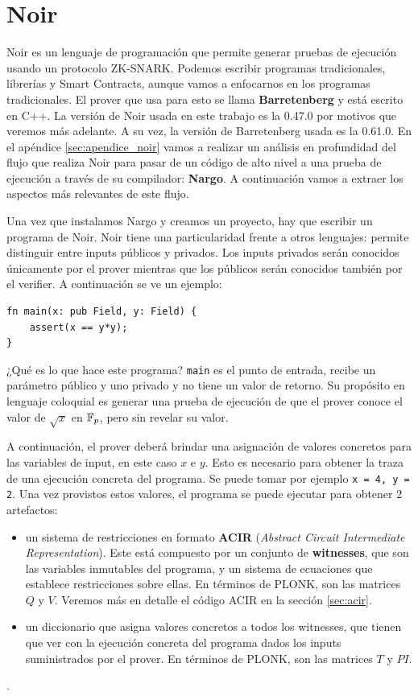 \chapter{Noir}\label{sec:noir}
Noir es un lenguaje de programación que permite generar pruebas de ejecución usando un protocolo ZK-SNARK. Podemos escribir programas tradicionales, librerías y Smart Contracts, aunque vamos a enfocarnos en los programas tradicionales. El prover que usa para esto se llama \textbf{Barretenberg} y está escrito en C++. La versión de Noir usada en este trabajo es la 0.47.0 por motivos que veremos más adelante. A su vez, la versión de Barretenberg usada es la 0.61.0. En el apéndice \ref{sec:apendice_noir} vamos a realizar un análisis en profundidad del flujo que realiza Noir para pasar de un código de alto nivel a una prueba de ejecución a través de su compilador: \textbf{Nargo}. A continuación vamos a extraer los aspectos más relevantes de este flujo.

Una vez que instalamos Nargo y creamos un proyecto, hay que escribir un programa de Noir. Noir tiene una particularidad frente a otros lenguajes: permite distinguir entre inputs públicos y privados. Los inputs privados serán conocidos únicamente por el prover mientras que los públicos serán conocidos también por el verifier. A continuación se ve un ejemplo:

\begin{verbatim}
fn main(x: pub Field, y: Field) {
    assert(x == y*y);
}
\end{verbatim}


¿Qué es lo que hace este programa? \texttt{main} es el punto de entrada, recibe un parámetro público y uno privado y no tiene un valor de retorno. Su propósito en lenguaje coloquial es generar una prueba de ejecución de que el prover conoce el valor de $\sqrt{x}$ en $\mathbb{F}_p$, pero sin revelar su valor. 

A continuación, el prover deberá brindar una asignación de valores concretos para las variables de input, en este caso $x$ e $y$. Esto es necesario para obtener la traza de una ejecución concreta del programa. Se puede tomar por ejemplo \texttt{x = 4, y = 2}. Una vez provistos estos valores, el programa se puede ejecutar para obtener 2 artefactos:

\begin{itemize}
	\item un sistema de restricciones en formato \textbf{ACIR} (\textit{Abstract Circuit Intermediate Representation}). Este está compuesto por un conjunto de \textbf{witnesses}, que son las variables inmutables del programa, y un sistema de ecuaciones que establece restricciones sobre ellas. En términos de PLONK, son las matrices $Q$ y $V$. Veremos más en detalle el código ACIR en la sección \ref{sec:acir}.
	\item un diccionario que asigna valores concretos a todos los witnesses, que tienen que ver con la ejecución concreta del programa dados los inputs suministrados por el prover. En términos de PLONK, son las matrices $T$ y $PI$.
\end{itemize}. 


